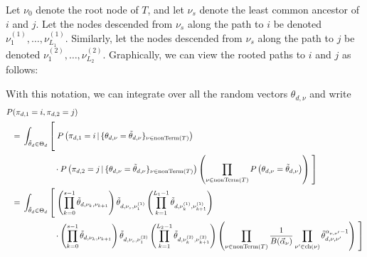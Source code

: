 \documentclass{article}
\theoremstyle{definition}
\newcommand{\nonTerm}{\text{nonTerm}}
\newcommand{\tallbracketl}[2]{\left #1 \rule{0ex}{#2} \right.}
\newcommand{\tallbracketr}[2]{\left. \rule{0ex}{#2} \right #1}
\begin{document}
Let $\nu_0$ denote the root node of $T$, and let $\nu_s$ denote the least common ancestor of $i$ and $j$.
Let the nodes descended from $\nu_s$ along the path to $i$ be denoted $\nu^{(1)}_1, \ldots, \nu^{(1)}_{L_1}$.
Similarly, let the nodes descended from $\nu_s$ along the path to $j$ be denoted $\nu^{(2)}_1, \ldots, \nu^{(2)}_{L_2}$.
Graphically, we can view the rooted paths to $i$ and $j$ as follows:
\begin{center}
\end{center}

With this notation, we can integrate over all the random vectors $\theta_{d,\nu}$ and write
{
\newcommand{\prefix}{\int_{\tilde \theta_d \in \Theta_d} \tallbracketl{[}{5ex}}
\begin{align*}
\MoveEqLeft
P(\pi_{d,1} = i, \pi_{d,2} = j)
\\
={}&
\prefix
  P\left(\pi_{d,1}=i \,|\, \{ \theta_{d,\nu} = \tilde \theta_{d,\nu} \}_{\nu \in \nonTerm(T)}\right)
\\ &\phantom{\prefix}
  \cdot P\left(\pi_{d,2}=j \,|\, \{ \theta_{d,\nu} = \tilde \theta_{d,\nu} \}_{\nu \in \nonTerm(T)}\right)
  \left(
    \prod_{\nu \in \nonTerm(T)} P\left(\theta_{d,\nu} = \tilde \theta_{d,\nu}\right)
  \right)
  \tallbracketr{]}{5ex}
\\
={}&
\prefix
  \left(
    \prod_{k=0}^{s-1} \tilde \theta_{d,\nu_k,\nu_{k+1}}
  \right)
  \tilde \theta_{d,\nu_s,\nu^{(1)}_1}
  \left(
    \prod_{k=1}^{L_1-1} \tilde \theta_{d,\nu^{(1)}_{k},\nu^{(1)}_{k+1}}
  \right)
\\ &\phantom{\prefix}
  \cdot
  \left(
    \prod_{k=0}^{s-1} \tilde \theta_{d,\nu_k,\nu_{k+1}}
  \right)
  \tilde \theta_{d,\nu_s,\nu^{(2)}_1}
  \left(
    \prod_{k=1}^{L_2-1} \tilde \theta_{d,\nu^{(2)}_{k},\nu^{(2)}_{k+1}}
  \right)
  \left(
    \prod_{\nu \in \nonTerm(T)}
    \frac{1}{B(\vec\alpha_\nu)}
    \prod_{\nu' \in \text{ch}(\nu)}
    \tilde \theta_{d,\nu,\nu'}^{\alpha_{\nu,\nu'}-1}
  \right)
  \tallbracketr{]}{5ex}
\end{align*}
}
\end{document}
